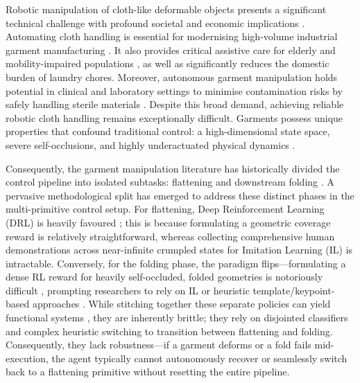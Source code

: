 \documentclass[journal]{IEEEtran}
\begin{document}
Robotic manipulation of cloth-like deformable objects presents a significant technical challenge with profound societal and economic implications \cite{kadi2023data}. Automating cloth handling is essential for modernising high-volume industrial garment manufacturing \cite{nayak2018introduction}. It also provides critical assistive care for elderly and mobility-impaired populations \cite{WTOaged2024, disablity2011world, ohneberg2023assistive}, as well as significantly reduces the domestic burden of laundry chores. Moreover, autonomous garment manipulation holds potential in clinical and laboratory settings to minimise contamination risks by safely handling sterile materials \cite{cornish2021clinical}. Despite this broad demand, achieving reliable robotic cloth handling remains exceptionally difficult. Garments possess unique properties that confound traditional control: a high-dimensional state space, severe self-occlusions, and highly underactuated physical dynamics \cite{xue2023unifolding, kadi2023data}. 

Consequently, the garment manipulation literature has historically divided the control pipeline into isolated subtasks: flattening and downstream folding \cite{doumanoglou2016folding}. A pervasive methodological split has emerged to address these distinct phases in the multi-primitive control setup. For flattening, Deep Reinforcement Learning (DRL) is heavily favoured \cite{canberk2022cloth, avigal2022speedfolding, ha2022flingbot, zhou2022aps}; this is because formulating a geometric coverage reward is relatively straightforward, whereas collecting comprehensive human demonstrations across near-infinite crumpled states for Imitation Learning (IL) is intractable. Conversely, for the folding phase, the paradigm flips---formulating a dense RL reward for heavily self-occluded, folded geometries is notoriously difficult \cite{kadi2025lagarnet}, prompting researchers to rely on IL or heuristic template/keypoint-based approaches \cite{barbany2025bifold}. While stitching together these separate policies can yield functional systems \cite{avigal2022speedfolding, canberk2022cloth, xue2023unifolding}, they are inherently brittle; they rely on disjointed classifiers and complex heuristic switching to transition between flattening and folding. Consequently, they lack robustness---if a garment deforms or a fold fails mid-execution, the agent typically cannot autonomously recover or seamlessly switch back to a flattening primitive without resetting the entire pipeline. 
\end{document}
